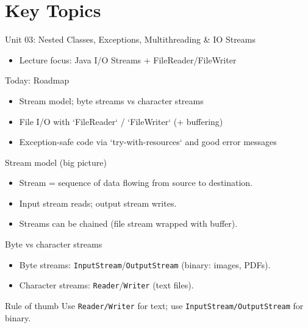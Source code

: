 \documentclass{beamer}
\begin{document}
\section{Key Topics}
\label{sec:concepts}

\begin{frame}{Unit 03: Nested Classes, Exceptions, Multithreading \& IO Streams}
  \begin{itemize}[<+->]
    \item Lecture focus: Java I/O Streams + FileReader/FileWriter
  \end{itemize}
  \slidesources{\OOPSUnitIIISources}
\end{frame}

\begin{frame}{Today: Roadmap}
  \begin{itemize}[<+->]
    \item Stream model; byte streams vs character streams
    \item File I/O with `FileReader` / `FileWriter` (+ buffering)
    \item Exception-safe code via `try-with-resources` and good error messages
  \end{itemize}
  \slidesources{\OOPSUnitIIISources}
\end{frame}

\begin{frame}{Stream model (big picture)}
  \begin{itemize}[<+->]
    \item Stream = sequence of data flowing from source to destination.
    \item Input stream reads; output stream writes.
    \item Streams can be chained (file stream wrapped with buffer).
  \end{itemize}
  \slidesources{\OOPSUnitIIISources}
\end{frame}

\begin{frame}{Byte vs character streams}
  \begin{itemize}[<+->]
    \item Byte streams: \texttt{InputStream}/\texttt{OutputStream} (binary: images, PDFs).
    \item Character streams: \texttt{Reader}/\texttt{Writer} (text files).
  \end{itemize}
  \begin{block}{Rule of thumb}
    Use \texttt{Reader/Writer} for text; use \texttt{InputStream/OutputStream} for binary.
  \end{block}
  \slidesources{\OOPSUnitIIISources}
\end{frame}
\end{document}
